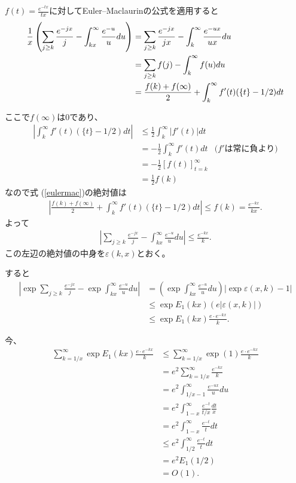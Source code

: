 \documentclass{jsarticle}
\theoremstyle{definition}
\begin{document}
$f(t) = \frac{e^{-tx}}{tx}$に対してEuler--Maclaurinの公式を適用すると
\begin{align}
\frac{1}{x} \left(
\sum_{j \ge k} \frac{e^{-jx}}{j}
- \int_{kx}^\infty \frac{e^{-u}}{u} du
\right)
&= \sum_{j \ge k} \frac{e^{-jx}}{jx}
- \int_{k}^\infty \frac{e^{-ux}}{ux} du  \notag \\
& = \sum_{j \ge k} f(j)
- \int_{k}^\infty f(u) du  \notag \\
& = \frac{f(k)+f(\infty)}{2} + \int_k^\infty f'(t) (\{t\} - 1/2) dt \label{eulermac}
\end{align}

ここで$f(\infty)$は$0$であり、
\begin{align*}
\left| \int_k^\infty f'(t) (\{t\} - 1/2) dt \right|
&\le \frac{1}{2} \int_k^\infty |f'(t)| dt \\
&= - \frac{1}{2} \int_k^\infty f'(t) dt & \text{($f'$は常に負より)} \\
&= - \frac{1}{2} [f(t)]_{t=k}^\infty \\
&= \frac{1}{2} f(k)
\end{align*}
なので式 (\ref{eulermac})の絶対値は
\begin{align*}
\left|
\frac{f(k)+f(\infty)}{2} + \int_k^\infty f'(t) (\{t\} - 1/2) dt
\right| \le f(k) = \frac{e^{-k x}}{k x}.
\end{align*}
よって
\begin{align*}
\left|
\sum_{j \ge k} \frac{e^{-jx}}{j}
- \int_{kx}^\infty \frac{e^{-u}}{u} du
\right| \le \frac{e^{-k x}}{k}.
\end{align*}
この左辺の絶対値の中身を$\varepsilon(k, x)$とおく。

すると
\begin{align*}
\left|\exp \sum_{j \ge k} \frac{e^{-jx}}{j}
- \exp \int_{kx}^\infty \frac{e^{-u}}{u} du\right|
&= \left(\exp \int_{kx}^\infty \frac{e^{-u}}{u} du\right) |\exp \varepsilon(x, k) - 1| \\
&\le \exp E_1(k x) (e |\varepsilon(x, k)|) \\
&\le \exp E_1(k x) \frac{e \cdot e^{-k x}}{k}.
\end{align*}

今、
\begin{align*}
\sum_{k=1/x}^\infty \exp E_1(k x) \frac{e \cdot e^{-k x}}{k}
&\le \sum_{k=1/x}^\infty \exp (1) \frac{e \cdot e^{-k x}}{k} \\
&= e^2 \sum_{k=1/x}^\infty \frac{e^{-k x}}{k} \\
&= e^2 \int_{1/x-1}^\infty \frac{e^{-u x}}{u} du \\
&= e^2 \int_{1-x}^\infty \frac{e^{-t}}{t/x} \frac{dt}{x} \\
&= e^2 \int_{1-x}^\infty \frac{e^{-t}}{t} dt \\
&\le e^2 \int_{1/2}^\infty \frac{e^{-t}}{t} dt \\
&= e^2 E_1(1/2) \\
&= O(1).
\end{align*}
\end{document}
